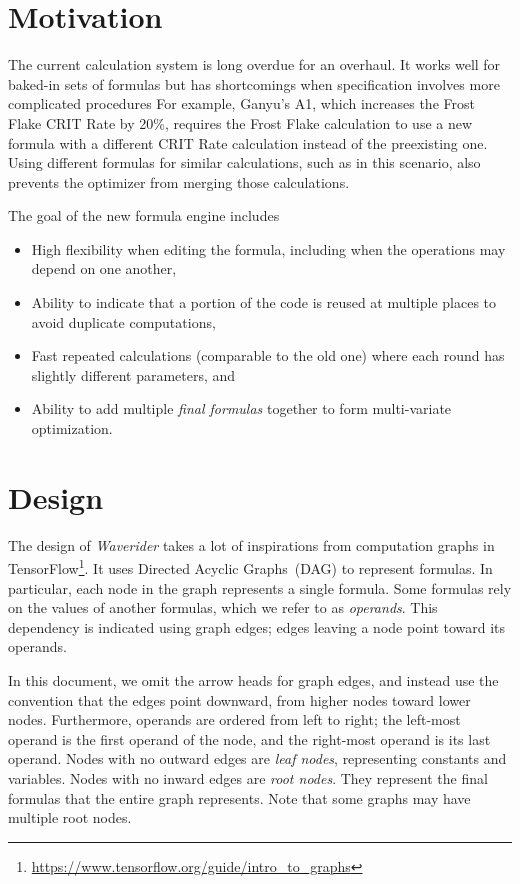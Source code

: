 \documentclass{article}
\begin{document}
\section{Motivation}

The current calculation system is long overdue for an overhaul.
It works well for baked-in sets of formulas but has shortcomings when specification involves more complicated procedures
For example, Ganyu's A1, which increases the Frost Flake CRIT Rate by 20\%, requires the Frost Flake calculation to use a new formula with a different CRIT Rate calculation instead of the preexisting one.
Using different formulas for similar calculations, such as in this scenario, also prevents the optimizer from merging those calculations.

The goal of the new formula engine includes

\begin{itemize}
  \item High flexibility when editing the formula, including when the operations may depend on one another,
  \item Ability to indicate that a portion of the code is reused at multiple places to avoid duplicate computations,
  \item Fast repeated calculations (comparable to the old one) where each round has slightly different parameters, and
  \item Ability to add multiple \emph{final formulas} together to form multi-variate optimization.
\end{itemize}

\section{Design}

The design of \emph{Waverider} takes a lot of inspirations from computation graphs in TensorFlow\footnote{
  \url{https://www.tensorflow.org/guide/intro_to_graphs}
}.
It uses Directed Acyclic Graphs~(DAG) to represent formulas.
In particular, each node in the graph represents a single formula.
Some formulas rely on the values of another formulas, which we refer to as \emph{operands}.
This dependency is indicated using graph edges; edges leaving a node point toward its operands.

In this document, we omit the arrow heads for graph edges, and instead use the convention that the edges point downward, from higher nodes toward lower nodes.
Furthermore, operands are ordered from left to right; the left-most operand is the first operand of the node, and the right-most operand is its last operand.
Nodes with no outward edges are \emph{leaf nodes}, representing constants and variables.
Nodes with no inward edges are \emph{root nodes}.
They represent the final formulas that the entire graph represents.
Note that some graphs may have multiple root nodes.
\end{document}
